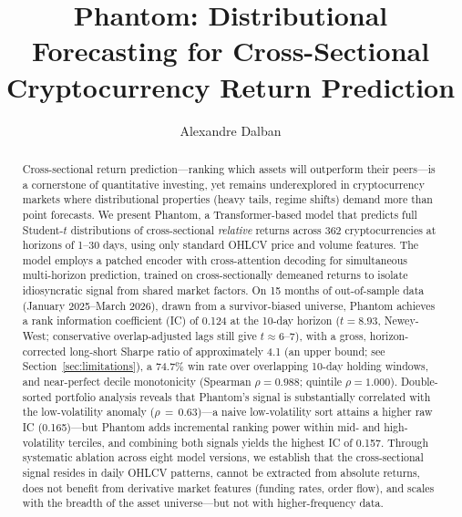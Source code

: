 \documentclass[sigconf]{acmart}
\begin{document}

\title{Phantom: Distributional Forecasting for Cross-Sectional\\Cryptocurrency Return Prediction}

\author{Alexandre Dalban}

%

\begin{abstract}
Cross-sectional return prediction---ranking which assets will outperform their peers---is a cornerstone of quantitative investing, yet remains underexplored in cryptocurrency markets where distributional properties (heavy tails, regime shifts) demand more than point forecasts.
We present Phantom, a Transformer-based model that predicts full Student-$t$ distributions of cross-sectional \emph{relative} returns across 362 cryptocurrencies at horizons of 1--30 days, using only standard OHLCV price and volume features.
The model employs a patched encoder with cross-attention decoding for simultaneous multi-horizon prediction, trained on cross-sectionally demeaned returns to isolate idiosyncratic signal from shared market factors.
On 15 months of out-of-sample data (January 2025--March 2026), drawn from a survivor-biased universe, Phantom achieves a rank information coefficient (IC) of 0.124 at the 10-day horizon ($t = 8.93$, Newey-West; conservative overlap-adjusted lags still give $t \approx 6$--$7$), with a gross, horizon-corrected long-short Sharpe ratio of approximately 4.1 (an upper bound; see Section~\ref{sec:limitations}), a 74.7\% win rate over overlapping 10-day holding windows, and near-perfect decile monotonicity (Spearman $\rho = 0.988$; quintile $\rho = 1.000$).
Double-sorted portfolio analysis reveals that Phantom's signal is substantially correlated with the low-volatility anomaly ($\rho\,{=}\,$0.63)---a naive low-volatility sort attains a higher raw IC (0.165)---but Phantom adds incremental ranking power within mid- and high-volatility terciles, and combining both signals yields the highest IC of 0.157.
Through systematic ablation across eight model versions, we establish that the cross-sectional signal resides in daily OHLCV patterns, cannot be extracted from absolute returns, does not benefit from derivative market features (funding rates, order flow), and scales with the breadth of the asset universe---but not with higher-frequency data.
\end{abstract}
\end{document}
